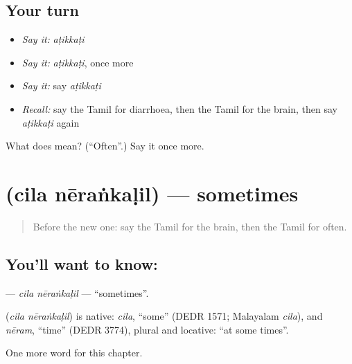 \subsection*{Your turn}
\begin{itemize}
\raggedright
  \item \emph{Say it:} \emph{aṭikkaṭi}
  \item \emph{Say it:} \emph{aṭikkaṭi}, once more
  \item \emph{Say it:} say \emph{aṭikkaṭi}
  \item \emph{Recall:} say the Tamil for diarrhoea, then the Tamil for the brain, then say \emph{aṭikkaṭi} again
\end{itemize}

\begin{tcolorbox}[breakable,colback=teal!4,colframe=teal!35!black,title={Before you move on}]
What does  mean? (\textquotedblleft{}Often\textquotedblright{}.) Say it once more.
\end{tcolorbox}
\section[\texorpdfstring{\ta{சில} \ta{நேரங்களில்} (cila nēraṅkaḷil)}{சில நேரங்களில் (cila nēraṅkaḷil)}]{  (cila nēraṅkaḷil) — sometimes}

\label{lesson:TA-C171-cila-nerankalil}



\begin{quote}
Before the new one: say the Tamil for the brain, then the Tamil for often.
\end{quote}

\subsection*{You'll want to know:  }
\textbf{ } — \emph{cila nēraṅkaḷil} — \textquotedblleft{}sometimes\textquotedblright{}.

\begin{cousinweb}
\textbf{ } (\emph{cila nēraṅkaḷil}) is native: \emph{cila}, \textquotedblleft{}some\textquotedblright{} (DEDR 1571; Malayalam \emph{cila}), and \emph{nēram}, \textquotedblleft{}time\textquotedblright{} (DEDR 3774), plural and locative: \textquotedblleft{}at some times\textquotedblright{}.
\end{cousinweb}

\begin{grammarlens}[title={What you've built}]
One more word for this chapter.
\end{grammarlens}

